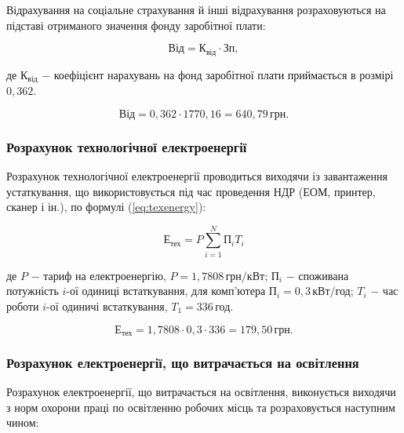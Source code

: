 Відрахування на соціальне страхування й інші відрахування розраховуються на підставі отриманого значення фонду заробітної плати:

\begin{equation}\label{eq:soc}
\text{Від} = \text{К}_{\text{від}} \cdot \text{Зп},
\end{equation}


\noindent де $\text{К}_{\text{від}}$ $-$ коефіцієнт нарахувань на фонд заробітної плати приймається в розмірі $0,362$.

\[
\text{Від} = 0,362 \cdot 1770,16 = 640,79 \, \text{грн}.
\]

\vspace{1.5em}

\subsubsection{Розрахунок технологічної електроенергії}

Розрахунок технологічної електроенергії проводиться виходячи із завантаження устаткування, що використовується під час проведення НДР (ЕОМ, принтер, сканер і ін.), по формулі (\ref{eq:texenergy}):

\begin{equation}\label{eq:texenergy}
\text{Е}_{\text{тех}} = P \sum_{i=1}^{N}\text{П}_{i}T_{i}
\end{equation}

\noindent де $P$ $-$ тариф на електроенергію, $P = 1,7808 \, \text{грн}/\text{кВт}$; \newline
\hspace*{15pt} $\text{П}_{i}$ $-$ споживана потужність $i$-ої одиниці встаткування, для комп'ютера $\text{П}_{i} = 0,3 \, \text{кВт}/\text{год}$;\newline
\hspace*{15pt} $T_{i}$ $-$ час роботи $i$-ої одиничі встаткування, $T_{1} = 336 \, \text{год}$.

\[
\text{Е}_{\text{тех}} = 1,7808 \cdot 0,3 \cdot 336 = 179,50 \, \text{грн}.
\]

\vspace{1.5em}

\subsubsection{Розрахунок електроенергії, що витрачається на освітлення}

Розрахунок електроенергії, що витрачається на освітлення, виконується виходячи з норм охорони праці по освітленню робочих місць та розраховується наступним чином:

